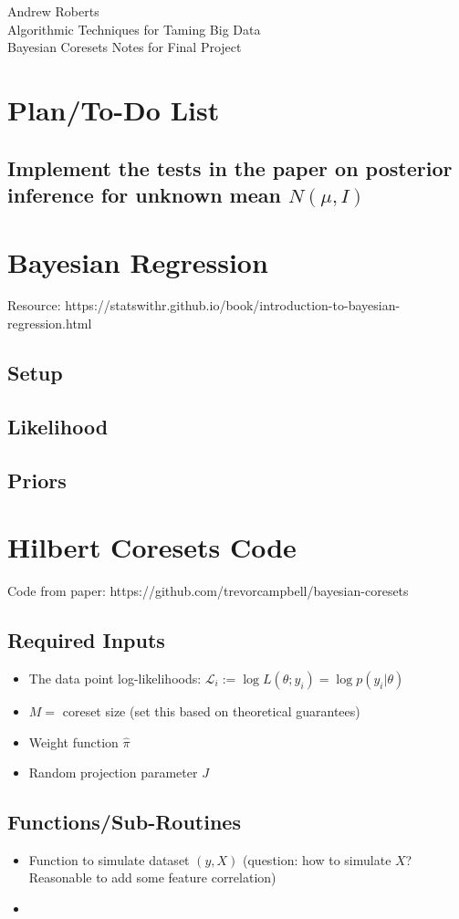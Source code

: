 \documentclass[12pt]{amsart}
\theoremstyle{plain}
\begin{document}
\begin{center}
Andrew Roberts \\
Algorithmic Techniques for Taming Big Data \\
Bayesian Coresets Notes for Final Project
\end{center}
\smallskip

\section{Plan/To-Do List}
\subsection{Implement the tests in the paper on posterior inference for unknown mean $N(\mu, I)$}




\section{Bayesian Regression}
Resource: https://statswithr.github.io/book/introduction-to-bayesian-regression.html

\subsection{Setup}
\subsection{Likelihood}
\subsection{Priors}

\section{Hilbert Coresets Code}
Code from paper: https://github.com/trevorcampbell/bayesian-coresets

\subsection{Required Inputs}
\begin{itemize} 
\item The data point log-likelihoods: $\mathcal{L}_i := \log L(\theta; y_i) = \log p(y_i|\theta)$
\item $M = $ coreset size (set this based on theoretical guarantees)
\item Weight function $\hat{\pi}$
\item Random projection parameter $J$
\end{itemize} 

\subsection{Functions/Sub-Routines}
\begin{itemize} 
\item Function to simulate dataset $(y, X)$ (question: how to simulate $X$? Reasonable to add some feature correlation) 
\item 
\end{itemize} 
\end{document}
